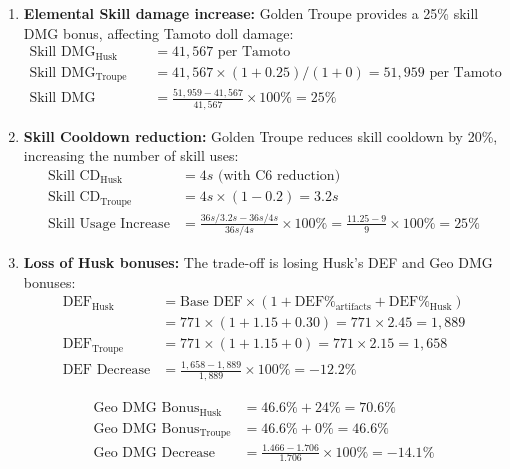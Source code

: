 \documentclass[12pt,a4paper]{article}
\begin{document}
\begin{enumerate}
    \item \textbf{Elemental Skill damage increase:} Golden Troupe provides a 25\% skill DMG bonus, affecting Tamoto doll damage:
    \begin{align}
    \text{Skill DMG}_{\text{Husk}} &= 41,567 \text{ per Tamoto} \\
    \text{Skill DMG}_{\text{Troupe}} &= 41,567 \times (1 + 0.25) / (1 + 0) = 51,959 \text{ per Tamoto} \\
    \text{Skill DMG Increase} &= \frac{51,959 - 41,567}{41,567} \times 100\% = 25\%
    \end{align}
    
    \item \textbf{Skill Cooldown reduction:} Golden Troupe reduces skill cooldown by 20\%, increasing the number of skill uses:
    \begin{align}
    \text{Skill CD}_{\text{Husk}} &= 4s \text{ (with C6 reduction)} \\
    \text{Skill CD}_{\text{Troupe}} &= 4s \times (1 - 0.2) = 3.2s \\
    \text{Skill Usage Increase} &= \frac{36s/3.2s - 36s/4s}{36s/4s} \times 100\% = \frac{11.25 - 9}{9} \times 100\% = 25\%
    \end{align}
    
    \item \textbf{Loss of Husk bonuses:} The trade-off is losing Husk's DEF and Geo DMG bonuses:
    \begin{align}
    \text{DEF}_{\text{Husk}} &= \text{Base DEF} \times (1 + \text{DEF\%}_{\text{artifacts}} + \text{DEF\%}_{\text{Husk}}) \\
    &= 771 \times (1 + 1.15 + 0.30) = 771 \times 2.45 = 1,889 \\
    \text{DEF}_{\text{Troupe}} &= 771 \times (1 + 1.15 + 0) = 771 \times 2.15 = 1,658 \\
    \text{DEF Decrease} &= \frac{1,658 - 1,889}{1,889} \times 100\% = -12.2\%
    \end{align}
    
    \begin{align}
    \text{Geo DMG Bonus}_{\text{Husk}} &= 46.6\% + 24\% = 70.6\% \\
    \text{Geo DMG Bonus}_{\text{Troupe}} &= 46.6\% + 0\% = 46.6\% \\
    \text{Geo DMG Decrease} &= \frac{1.466 - 1.706}{1.706} \times 100\% = -14.1\%
    \end{align}
\end{enumerate}
\end{document}
